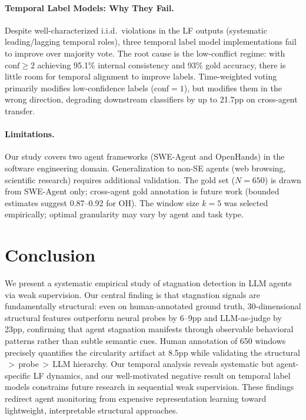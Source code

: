 \documentclass[11pt,a4paper]{article}
\begin{document}
\paragraph{Temporal Label Models: Why They Fail.}
Despite well-characterized i.i.d.\ violations in the LF outputs (systematic leading/lagging temporal roles), three temporal label model implementations fail to improve over majority vote.
The root cause is the low-conflict regime: with $\text{conf}{\geq}2$ achieving 95.1\% internal consistency and 93\% gold accuracy, there is little room for temporal alignment to improve labels.
Time-weighted voting primarily modifies low-confidence labels ($\text{conf}{=}1$), but modifies them in the wrong direction, degrading downstream classifiers by up to 21.7pp on cross-agent transfer.

\paragraph{Limitations.}
Our study covers two agent frameworks (SWE-Agent and OpenHands) in the software engineering domain. Generalization to non-SE agents (web browsing, scientific research) requires additional validation. The gold set ($N{=}650$) is drawn from SWE-Agent only; cross-agent gold annotation is future work (bounded estimates suggest 0.87--0.92 for OH). The window size $k{=}5$ was selected empirically; optimal granularity may vary by agent and task type.


\section{Conclusion}
\label{sec:conclusion}

We present a systematic empirical study of stagnation detection in LLM agents via weak supervision.
Our central finding is that stagnation signals are fundamentally structural: even on human-annotated ground truth, 30-dimensional structural features outperform neural probes by 6--9pp and LLM-as-judge by 23pp, confirming that agent stagnation manifests through observable behavioral patterns rather than subtle semantic cues.
Human annotation of 650 windows precisely quantifies the circularity artifact at 8.5pp while validating the structural$\,{>}\,$probe$\,{>}\,$LLM hierarchy.
Our temporal analysis reveals systematic but agent-specific LF dynamics, and our well-motivated negative result on temporal label models constrains future research in sequential weak supervision.
These findings redirect agent monitoring from expensive representation learning toward lightweight, interpretable structural approaches.
\end{document}
